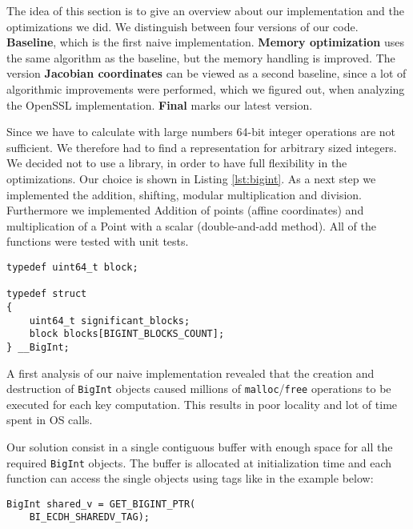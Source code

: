 The idea of this section is to give an overview about our implementation and the optimizations we did. We distinguish between four versions of our code. \textbf{Baseline}, which is the first naive implementation. \textbf{Memory optimization} uses the same algorithm as the baseline, but the memory handling is improved. The version \textbf{Jacobian coordinates} can be viewed as a second baseline, since a lot of algorithmic improvements were performed, which we figured out, when analyzing the OpenSSL implementation. \textbf{Final} marks our latest version.

Since we have to calculate with large numbers 64-bit integer operations are not sufficient. We therefore had to find a representation for arbitrary sized integers. We decided not to use a library, in order to have full flexibility in the optimizations. Our choice is shown in Listing \ref{lst:bigint}. As a next step we implemented the addition, shifting, modular multiplication and division. Furthermore we implemented Addition of points (affine coordinates) and multiplication of a Point with a scalar (double-and-add method). All of the functions were tested with unit tests.

\begin{lstlisting}[frame=single,  captionpos=b, caption=representation of the arbitrary size integers, label=lst:bigint]
typedef uint64_t block;

typedef struct 
{
    uint64_t significant_blocks;    
    block blocks[BIGINT_BLOCKS_COUNT]; 
} __BigInt;
\end{lstlisting}


A first analysis of our naive implementation revealed that the creation and destruction of \texttt{BigInt} objects caused millions of \texttt{malloc}/\texttt{free} operations to be executed for each key computation. This results in poor locality and lot of time spent in OS calls.

Our solution consist in a single contiguous buffer with enough space for all the required \texttt{BigInt} objects. The buffer is allocated at initialization time and each function can access the single objects using tags like in the example below:

\begin{lstlisting}[frame=single, mathescape=true, captionpos=b, caption=Access by tag example]
BigInt shared_v = GET_BIGINT_PTR(
    BI_ECDH_SHAREDV_TAG);
\end{lstlisting}

